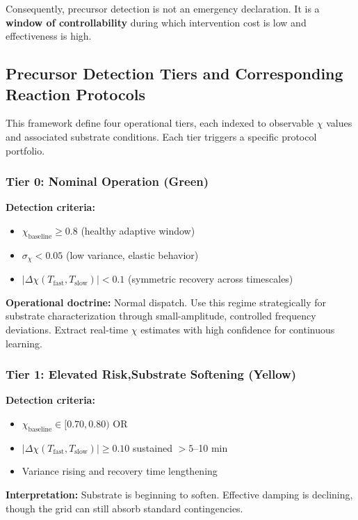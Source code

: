 \documentclass[11pt,letterpaper]{article}
\begin{document}
Consequently, precursor detection is not an emergency declaration. It is a \textbf{window of controllability} during which intervention cost is low and effectiveness is high.

\subsection{Precursor Detection Tiers and Corresponding Reaction Protocols}

This framework define four operational tiers, each indexed to observable $\chi$ values and associated substrate conditions. Each tier triggers a specific protocol portfolio.

\subsubsection{Tier 0: Nominal Operation (Green)}

\textbf{Detection criteria:}
\begin{itemize}
\item $\chi_{\text{baseline}} \geq 0.8$ (healthy adaptive window)
\item $\sigma_\chi < 0.05$ (low variance, elastic behavior)
\item $|\Delta\chi(T_{\text{fast}}, T_{\text{slow}})| < 0.1$ (symmetric recovery across timescales)
\end{itemize}

\textbf{Operational doctrine:} Normal dispatch. Use this regime strategically for substrate characterization through small-amplitude, controlled frequency deviations. Extract real-time $\chi$ estimates with high confidence for continuous learning.

\subsubsection{Tier 1: Elevated Risk,Substrate Softening (Yellow)}

\textbf{Detection criteria:}
\begin{itemize}
\item $\chi_{\text{baseline}} \in [0.70, 0.80)$ OR
\item $|\Delta\chi(T_{\text{fast}}, T_{\text{slow}})| \geq 0.10$ sustained $> 5$--10 min
\item Variance rising and recovery time lengthening
\end{itemize}

\textbf{Interpretation:} Substrate is beginning to soften. Effective damping is declining, though the grid can still absorb standard contingencies.
\end{document}
